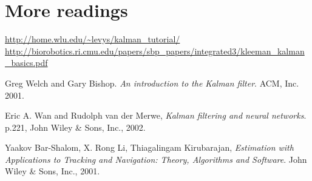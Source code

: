 \documentclass[12pt]{article}
\begin{document}
\section{More readings}
\noindent
\url{http://home.wlu.edu/~levys/kalman_tutorial/} \\
\url{http://biorobotics.ri.cmu.edu/papers/sbp_papers/integrated3/kleeman_kalman_basics.pdf}


\begin{thebibliography}{9}

Greg Welch and Gary Bishop.
\textit{An introduction to the Kalman filter}. 
ACM, Inc. 2001.

Eric A. Wan and Rudolph van der Merwe, 
\textit{Kalman filtering and neural networks}. p.221, John Wiley \& Sons, Inc., 2002.

Yaakov Bar-Shalom, X. Rong Li, Thiagalingam Kirubarajan,
\textit{Estimation with Applications to Tracking and Navigation: Theory, Algorithms and Software}. John Wiley \& Sons, Inc., 2001.



\end{thebibliography}
\end{document}
